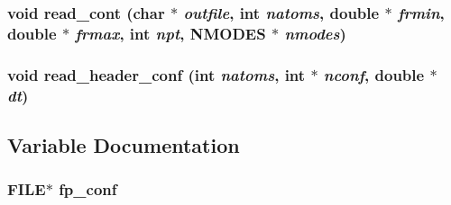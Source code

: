 \subsubsection{\setlength{\rightskip}{0pt plus 5cm}void read\_\-cont (char $\ast$ {\em outfile}, int {\em natoms}, double $\ast$ {\em frmin}, double $\ast$ {\em frmax}, int {\em npt}, {\bf NMODES} $\ast$ {\em nmodes})}\label{md__nmain_8c_26f5f17ebe0d187ba337bd7320076365}


\subsubsection{\setlength{\rightskip}{0pt plus 5cm}void read\_\-header\_\-conf (int {\em natoms}, int $\ast$ {\em nconf}, double $\ast$ {\em dt})}\label{md__nmain_8c_0b95c8c9e74d2270a7437cb3dd9a4a68}




\subsection{Variable Documentation}
\subsubsection{\setlength{\rightskip}{0pt plus 5cm}FILE$\ast$ {\bf fp\_\-conf}\hspace{0.3cm}{\tt  [static]}}\label{md__nmain_8c_08aab4972d9cac4c247f11231f9e2188}


